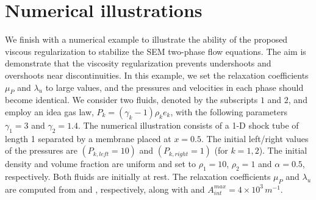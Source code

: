 \documentclass[preprint,10pt]{elsarticle}
\begin{document}
\section{Numerical illustrations}\label{sec:num-ill}
%
We finish with a numerical example to illustrate the ability of the proposed viscous regularization to stabilize the SEM two-phase flow equations. 
The aim is demonstrate that the viscosity regularization prevents undershoots and overshoots near discontinuities. 
In this example, we set the relaxation coefficients $\mu_P$ and $\lambda_u$ to large values, and the pressures and velocities in each phase should become identical. 
We consider two fluids, denoted by the subscripts $1$ and $2$, and employ an idea gas law, $P_k=(\gamma_k-1) \rho_k e_k$, with the following parameters $\gamma_1=3$ and $\gamma_2=1.4$. 
The numerical illustration consists of a 1-D shock tube of length 1 separated by a membrane placed at $x=0.5$. The initial left/right values of the pressures are
 $(P_{k,left}=10)$ and $(P_{k,right}=1)$ (for $k=1,2$). The initial density and volume fraction are uniform and set to $\rho_1=10$, $\rho_2=1$ and $\alpha = 0.5$, respectively. Both fluids are initially at rest. The relaxation coefficients $\mu_P$ and $\lambda_u$ are computed from  and , respectively, along with  and $A_{int}^{max}=4 \times 10^3\,m^{-1}$.
 
\end{document}
